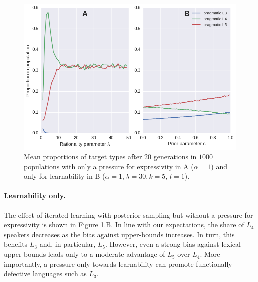 \documentclass[a4paper]{article}
\begin{document}


\begin{figure}
\centering
\includegraphics[scale=.5]{./only-R-or-M}
\caption{Mean proportions of target types after $20$ generations in $1000$ populations with only a pressure for expressivity in A ($\alpha = 1$) and only for learnability in B ($\alpha =1, \lambda = 30, k = 5$, $l=1$).}
\label{fig:either-R-or-M}
\end{figure}

\paragraph{Learnability only.} The effect of iterated learning with posterior sampling but without a pressure for expressivity is shown in Figure \ref{fig:either-R-or-M}.B. In line with our expectations, the share of $L_4$ speakers decreases as the bias against upper-bounds increases. In turn, this benefits $L_3$ and, in particular, $L_5$. However, even a strong bias against lexical upper-bounds leads only to a moderate advantage of $L_5$ over $L_4$. More importantly, a pressure only towards learnability can promote functionally defective languages such as $L_3$.
\end{document}
